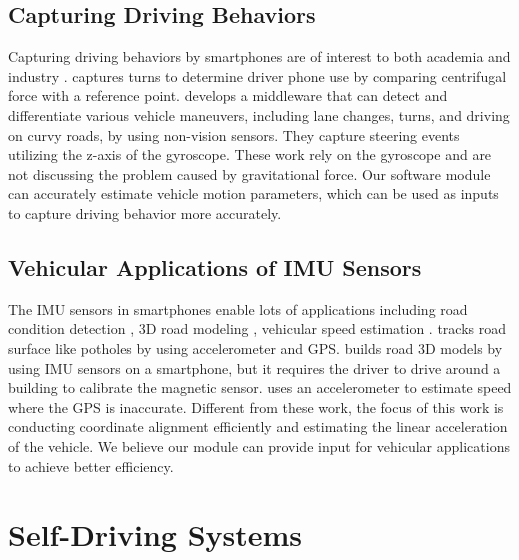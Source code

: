 \subsection{Capturing Driving Behaviors}

Capturing driving behaviors by smartphones are of interest
to both academia \cite{wang2013sensing, chen2015invisible} 
and industry \cite{uber, cmtelematics}. 
\cite{wang2013sensing} captures turns to determine driver phone
use by comparing centrifugal force with a reference point. 
\cite{chen2015invisible} develops a middleware that can detect 
and differentiate various vehicle maneuvers, 
including lane changes, turns, and driving on curvy roads,
by using non-vision sensors.
They capture steering events utilizing the z-axis of the gyroscope.
These work rely on the gyroscope and are not 
discussing the problem caused by gravitational force. 
Our software module can accurately estimate vehicle motion
parameters, which can be used as inputs to 
capture driving behavior more accurately. 

\subsection{Vehicular Applications of IMU Sensors}

The IMU sensors in smartphones enable lots of applications
including road condition detection \cite{Mohan2008Nericell},
3D road modeling \cite{yang2015low}, vehicular speed estimation \cite{hansenspeed}.
\cite{Mohan2008Nericell} tracks road surface like 
potholes by using accelerometer and GPS.
\cite{yang2015low} builds road 3D models by using IMU sensors on  a smartphone, but it requires the driver to drive 
around a building to calibrate the magnetic sensor. 
\cite{hansenspeed} uses an accelerometer to estimate speed 
where the GPS is inaccurate. 
Different from these work, the focus of this work is 
conducting coordinate alignment efficiently and estimating the linear acceleration of the vehicle.
We believe our module can provide input for vehicular applications 
to achieve better efficiency. 

 
\section{Self-Driving Systems}


